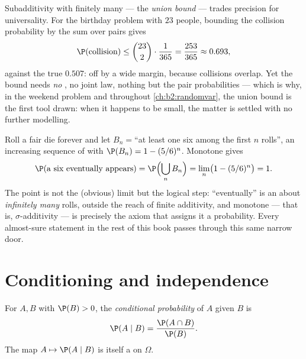 \begin{example}\label{ex:b2:proba:unionbound}
Subadditivity with finitely many  --- the \emph{union
bound} --- trades precision for universality. For the
birthday problem with $23$ people, bounding the collision
probability by the sum over pairs gives
\[
\P(\text{collision}) \leq \binom{23}2\cdot\frac1{365}
= \frac{253}{365} \approx 0.693 ,
\]
against the true $0.507$: off by a wide margin, because
collisions overlap. Yet the bound needs \emph{no}
, no joint law, nothing but the pair
probabilities --- which is why, in the weekend problem and
throughout \cref{ch:b2:randomvar}, the union bound is the
first tool drawn: when it happens to be small, the matter is
settled with no further modelling.
\end{example}

\begin{example}\label{ex:b2:proba:sixeventually}
Roll a fair die forever and let $B_n = {}$``at least one six
among the first $n$ rolls'', an increasing sequence of 
with $\P(B_n) = 1 - (5/6)^n$. Monotone  gives
\[
\P(\text{a six eventually appears})
= \P\Bigl(\bigcup_nB_n\Bigr)
= \lim_n\bigl(1 - (5/6)^n\bigr) = 1 .
\]
The point is not the (obvious) limit but the logical step:
``eventually'' is an  about \emph{infinitely many}
rolls, outside the reach of finite additivity, and monotone
 --- that is, $\sigma$-additivity --- is precisely
the axiom that assigns it a probability. Every almost-sure
statement in the rest of this book passes through this same
narrow door.
\end{example}

\section{Conditioning and independence}

\begin{definition}\label{def:b2:proba:conditional}
For  $A, B$ with $\P(B) > 0$, the \emph{conditional
probability} of $A$ given $B$ is
\[
\P(A \mid B) = \frac{\P(A \cap B)}{\P(B)} .
\]
The map $A \mapsto \P(A \mid B)$ is itself a 
on $\Omega$.
\end{definition}

